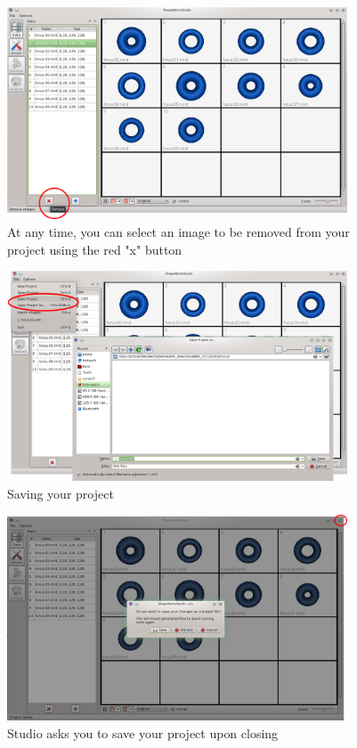 \documentclass[letterpaper,12pt]{article}   %
\begin{document}
\begin{figure}[!htp]
\centering
\includegraphics[width=0.9\textwidth]{figs/remove.png}
\caption{At any time, you can select an image to be removed from your project using the red "x" button}
\label{fig:remove}
\end{figure}

\begin{figure}[!htp]
\centering
\includegraphics[width=0.9\textwidth]{figs/save.png}
\caption{Saving your project}
\label{fig:save}
\end{figure}

\begin{figure}[!htp]
\centering
\includegraphics[width=0.9\textwidth]{figs/close.png}
\caption{Studio asks you to save your project upon closing}
\label{fig:close}
\end{figure}
\end{document}
